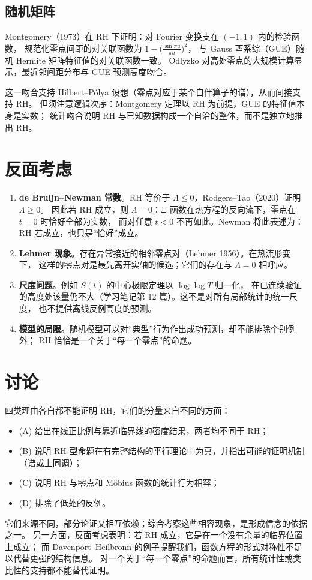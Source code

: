 \documentclass[11pt]{article}
\begin{document}
\subsection{随机矩阵}
Montgomery（1973）在 RH 下证明：对 Fourier 变换支在 $(-1,1)$ 内的检验函数，
规范化零点间距的对关联函数为 $1-\bigl(\frac{\sin\pi u}{\pi u}\bigr)^2$，
与 Gauss 酉系综（GUE）随机 Hermite 矩阵特征值的对关联函数一致。
Odlyzko 对高处零点的大规模计算显示，最近邻间距分布与 GUE 预测高度吻合。

这一吻合支持 Hilbert--Pólya 设想（零点对应于某个自伴算子的谱），从而间接支持 RH。
但须注意逻辑次序：Montgomery 定理以 RH 为前提，GUE 的特征值本身是实数；
统计吻合说明 RH 与已知数据构成一个自洽的整体，而不是独立地推出 RH。

\section{反面考虑}
\begin{enumerate}
 \item \textbf{de Bruijn--Newman 常数}。RH 等价于 $\Lambda\le0$，Rodgers--Tao（2020）证明 $\Lambda\ge0$。
 因此若 RH 成立，则 $\Lambda=0$：$\Xi$ 函数在热方程的反向流下，零点在 $t=0$ 时恰好全部为实数，
 而对任意 $t<0$ 不再如此。Newman 将此表述为：RH 若成立，也只是“恰好”成立。
 \item \textbf{Lehmer 现象}。存在异常接近的相邻零点对（Lehmer 1956）。在热流形变下，
 这样的零点对是最先离开实轴的候选；它们的存在与 $\Lambda=0$ 相呼应。
 \item \textbf{尺度问题}。例如 $S(t)$ 的中心极限定理以 $\log\log T$ 归一化，
 在已连续验证的高度处该量仍不大（学习笔记第 12 篇）。这不是对所有局部统计的统一尺度，
 也不提供离线反例高度的预测。
 \item \textbf{模型的局限}。随机模型可以对“典型”行为作出成功预测，却不能排除个别例外；
 RH 恰恰是一个关于“每一个零点”的命题。
\end{enumerate}

\section{讨论}
四类理由各自都不能证明 RH，它们的分量来自不同的方面：
\begin{itemize}
 \item (A) 给出在线正比例与靠近临界线的密度结果，两者均不同于 RH；
 \item (B) 说明 RH 型命题在有完整结构的平行理论中为真，并指出可能的证明机制（谱或上同调）；
 \item (C) 说明 RH 与零点和 Möbius 函数的统计行为相容；
 \item (D) 排除了低处的反例。
\end{itemize}
它们来源不同，部分论证又相互依赖；综合考察这些相容现象，是形成信念的依据之一。
另一方面，反面考虑表明：若 RH 成立，它是在一个没有余量的临界位置上成立；
而 Davenport--Heilbronn 的例子提醒我们，函数方程的形式对称性不足以代替更强的结构信息。
对一个关于“每一个零点”的命题而言，所有统计性或类比性的支持都不能替代证明。
\end{document}
